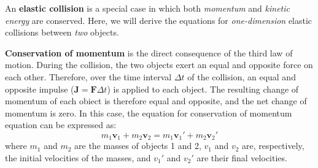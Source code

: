 An \textbf{elastic collision} is a special case in which both \emph{momentum}
and \emph{kinetic energy} are conserved. Here, we will derive the equations for
\emph{one-dimension} elastic collisions between \emph{two} objects.

\textbf{Conservation of momentum} is the direct consequence of the third law of
motion. During the collision, the two objects exert an equal and opposite force
on each other. Therefore, over the time interval $\Delta t$ of the collision,
an equal and opposite impulse ($\bm J=\bm F\Delta t$) is applied to each
object. The resulting change of momentum of each obiect is therefore equal and
opposite, and the net change of momentum is zero. In this case, the equation for
conservation of momentum equation can be expressed as:
\begin{equation}
  m_1\bm v_1+m_2\bm v_2=m_1\bm v_1'+m_2\bm v_2'
  \label{eq:mom1}
\end{equation}
where $m_1$ and $m_2$ are the masses of objects 1 and 2, $v_1$ and $v_2$ are,
respectively, the initial velocities of the masses, and $v_1'$ and $v_2'$ are
their final velocities.


